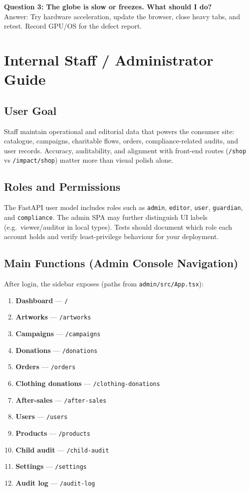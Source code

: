 \documentclass[11pt]{article}
\begin{document}
\textbf{Question 3: The globe is slow or freezes. What should I do?}\\
Answer: Try hardware acceleration, update the browser, close heavy tabs, and retest. Record GPU/OS for the defect report.

\section{Internal Staff / Administrator Guide}
\subsection{User Goal}
Staff maintain operational and editorial data that powers the consumer site: catalogue, campaigns, charitable flows, orders, compliance-related audits, and user records. Accuracy, auditability, and alignment with front-end routes (\texttt{/shop} vs \texttt{/impact/shop}) matter more than visual polish alone.

\subsection{Roles and Permissions}
The FastAPI user model includes roles such as \texttt{admin}, \texttt{editor}, \texttt{user}, \texttt{guardian}, and \texttt{compliance}. The admin SPA may further distinguish UI labels (e.g.\ viewer/auditor in local types). Tests should document which role each account holds and verify least-privilege behaviour for your deployment.

\subsection{Main Functions (Admin Console Navigation)}
After login, the sidebar exposes (paths from \texttt{admin/src/App.tsx}):
\begin{enumerate}[leftmargin=2.2em]
    \item \textbf{Dashboard} --- \texttt{/}
    \item \textbf{Artworks} --- \texttt{/artworks}
    \item \textbf{Campaigns} --- \texttt{/campaigns}
    \item \textbf{Donations} --- \texttt{/donations}
    \item \textbf{Orders} --- \texttt{/orders}
    \item \textbf{Clothing donations} --- \texttt{/clothing-donations}
    \item \textbf{After-sales} --- \texttt{/after-sales}
    \item \textbf{Users} --- \texttt{/users}
    \item \textbf{Products} --- \texttt{/products}
    \item \textbf{Child audit} --- \texttt{/child-audit}
    \item \textbf{Settings} --- \texttt{/settings}
    \item \textbf{Audit log} --- \texttt{/audit-log}
\end{enumerate}
\end{document}
